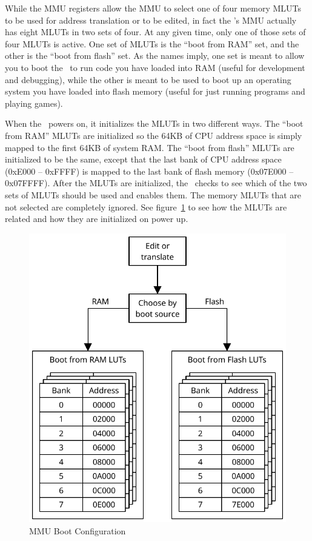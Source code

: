 While the MMU registers allow the MMU to select one of four memory MLUTs to be used for address translation or to be edited, in fact the \jr's MMU actually has eight MLUTs in two sets of four. At any given time, only one of those sets of four MLUTs is active. One set of MLUTs is the ``boot from RAM'' set, and the other is the ``boot from flash'' set. As the names imply, one set is meant to allow you to boot the \jr\ to run code you have loaded into RAM (useful for development and debugging), while the other is meant to be used to boot up an operating system you have loaded into flash memory (useful for just running programs and playing games).

When the \jr\ powers on, it initializes the MLUTs in two different ways. The ``boot from RAM'' MLUTs are initialized so the 64KB of CPU address space is simply mapped to the first 64KB of system RAM. The ``boot from flash'' MLUTs are initialized to be the same, except that the last bank of CPU address space (0xE000 -- 0xFFFF) is mapped to the last bank of flash memory (0x07E000 -- 0x07FFFF). After the MLUTs are initialized, the \jr\ checks to see which of the two sets of MLUTs should be used and enables them. The memory MLUTs that are not selected are completely ignored. See figure~\ref{fig:lut_choice} to see how the MLUTs are related and how they are initialized on power up.

\begin{figure}[ht]
    \begin{center}
        \includegraphics[scale=0.65]{images/MemoryLUTSelection.pdf}
    \end{center}
    \caption{MMU Boot Configuration}
    \label{fig:lut_choice}
\end{figure}

